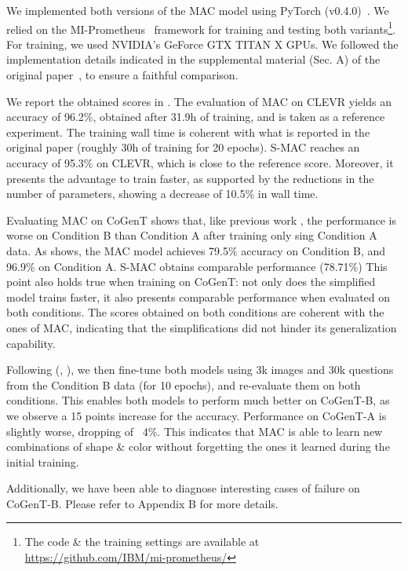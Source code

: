 We implemented both versions of the MAC model using PyTorch (v0.4.0)~\cite{paszke2017automatic}. We relied on the MI-Prometheus~\cite{kornuta2018accelerating} framework for training and testing both variants\footnote{The code \& the training settings are available at \url{https://github.com/IBM/mi-prometheus/}}. For training, we used NVIDIA's GeForce GTX TITAN X GPUs. We followed the implementation details indicated in the supplemental material (Sec. A) of the original paper~\cite{hudson2018compositional}, to ensure a faithful comparison.

We report the obtained scores in . The evaluation of MAC on CLEVR yields an accuracy of 96.2\%, obtained after 31.9h of training, and is taken as a reference experiment. The training wall time is coherent with what is reported in the original paper (roughly 30h of training for 20 epochs).
S-MAC reaches an accuracy of 95.3\% on CLEVR, which is close to the reference score. Moreover, it presents the advantage to train faster, as supported by the reductions in the number of parameters, showing a decrease of 10.5\% in wall time.

Evaluating MAC on CoGenT shows that, like previous work \cite{johnson2017inferring, mascharka2018transparency}, the performance is worse on Condition B than Condition A after training only sing Condition A data. As  shows, the MAC model achieves 79.5\% accuracy on Condition B, and 96.9\% on Condition A. S-MAC obtains comparable performance (78.71\%)
This point also holds true when training on CoGenT: not only does the simplified model trains faster, it also presents comparable performance when evaluated on both conditions. The scores obtained on both conditions are coherent with the ones of MAC, indicating that the simplifications did not hinder its generalization capability.

Following (\cite{johnson2017inferring}, \cite{perez2017film}), we then fine-tune both models using 3k images and 30k questions from the Condition B data (for 10 epochs), and re-evaluate them on both conditions. This enables both models to perform much better on CoGenT-B, as we observe a 15 points increase for the accuracy. Performance on CoGenT-A is slightly worse, dropping of ~4\%. This indicates that MAC is able to learn new combinations of shape \& color without forgetting the ones it learned during the initial training.

Additionally, we have been able to diagnose interesting cases of failure on CoGenT-B. Please refer to Appendix B for more details.
